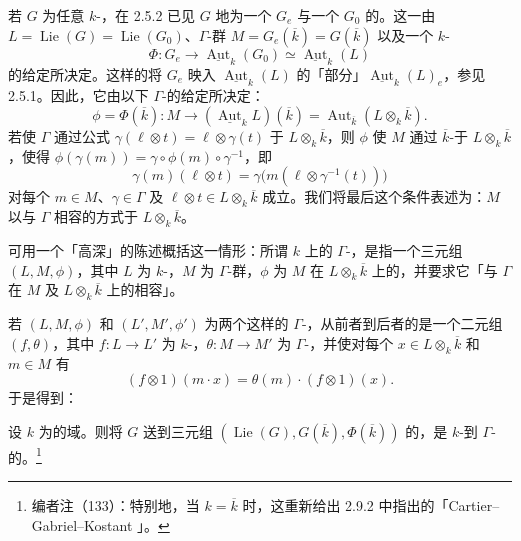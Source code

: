若 $G$ 为任意 $k$-，在 2.5.2 已见 $G$ 地为一个 $G_e$ 与一个 $G_0$ 的。这一由 $L=\operatorname{Lie}(G)=\operatorname{Lie}(G_0)$、$\Gamma$-群 $M=G_e(\overline k)=G(\overline k)$ 以及一个 $k$-
\[
\Phi:G_e\longrightarrow\underline{\operatorname{Aut}}_k(G_0)\simeq\underline{\operatorname{Aut}}_k(L)
\]
的给定所决定。这样的将 $G_e$ 映入 $\underline{\operatorname{Aut}}_k(L)$ 的「部分」$\underline{\operatorname{Aut}}_k(L)_e$，参见 2.5.1。因此，它由以下 $\Gamma$-的给定所决定：
\[
\phi=\Phi(\overline k):M\longrightarrow(\underline{\operatorname{Aut}}_kL)(\overline k)=\operatorname{Aut}_{\overline k}(L\otimes_k\overline k).
\]
若使 $\Gamma$ 通过公式 $\gamma(\ell\otimes t)=\ell\otimes\gamma(t)$ 于 $L\otimes_k\overline k$，则 $\phi$ 使 $M$ 通过 $\overline k$-于 $L\otimes_k\overline k$，使得 $\phi(\gamma(m))=\gamma\circ\phi(m)\circ\gamma^{-1}$，即
\[
\gamma(m)(\ell\otimes t)=\gamma\bigl(m(\ell\otimes\gamma^{-1}(t))\bigr)
\]
对每个 $m\in M$、$\gamma\in\Gamma$ 及 $\ell\otimes t\in L\otimes_k\overline k$ 成立。我们将最后这个条件表述为：$M$ 以与 $\Gamma$ 相容的方式于 $L\otimes_k\overline k$。

可用一个「高深」的陈述概括这一情形：所谓 $k$ 上的 $\Gamma$-，是指一个三元组 $(L,M,\phi)$，其中 $L$ 为 $k$-，$M$ 为 $\Gamma$-群，$\phi$ 为 $M$ 在 $L\otimes_k\overline k$ 上的，并要求它「与 $\Gamma$ 在 $M$ 及 $L\otimes_k\overline k$ 上的相容」。

若 $(L,M,\phi)$ 和 $(L',M',\phi')$ 为两个这样的 $\Gamma$-，从前者到后者的是一个二元组 $(f,\theta)$，其中 $f:L\to L'$ 为 $k$-，$\theta:M\to M'$ 为 $\Gamma$-，并使对每个 $x\in L\otimes_k\overline k$ 和 $m\in M$ 有
\[
(f\otimes1)(m\cdot x)=\theta(m)\cdot(f\otimes1)(x).
\]
于是得到：
\begin{SGAresult}{}{}
设 $k$ 为的域。则将 $G$ 送到三元组 $(\operatorname{Lie}(G),G(\overline k),\Phi(\overline k))$ 的，是 $k$-到 $\Gamma$-的。\footnote{编者注（133）：特别地，当 $k=\overline k$ 时，这重新给出 2.9.2 中指出的「Cartier--Gabriel--Kostant 」。}
\end{SGAresult}
